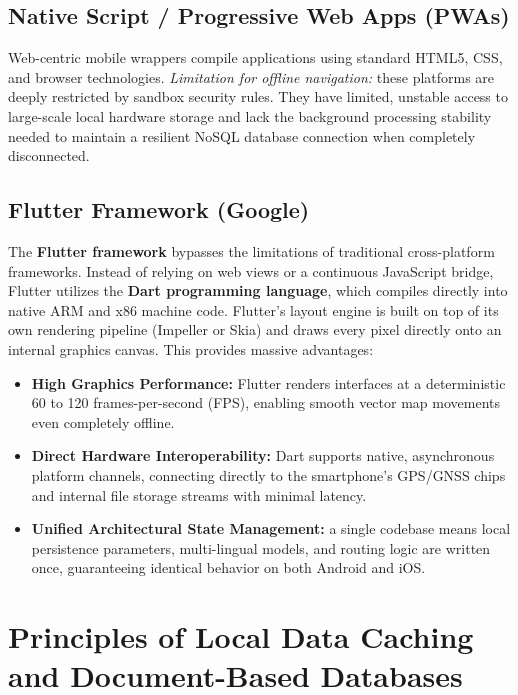 \documentclass[12pt,a4paper,oneside]{report}
\begin{document}
\subsection{Native Script / Progressive Web Apps (PWAs)}

Web-centric mobile wrappers compile applications using standard HTML5, CSS, and browser
technologies. \emph{Limitation for offline navigation:} these platforms are deeply
restricted by sandbox security rules. They have limited, unstable access to large-scale
local hardware storage and lack the background processing stability needed to maintain a
resilient NoSQL database connection when completely disconnected.

\subsection{Flutter Framework (Google)}

The \textbf{Flutter framework} bypasses the limitations of traditional cross-platform
frameworks. Instead of relying on web views or a continuous JavaScript bridge, Flutter
utilizes the \textbf{Dart programming language}, which compiles directly into native ARM
and x86 machine code. Flutter's layout engine is built on top of its own rendering
pipeline (Impeller or Skia) and draws every pixel directly onto an internal graphics
canvas. This provides massive advantages:

\begin{itemize}[leftmargin=1.4em]
  \item \textbf{High Graphics Performance:} Flutter renders interfaces at a deterministic
        60 to 120 frames-per-second (FPS), enabling smooth vector map movements even
        completely offline.
  \item \textbf{Direct Hardware Interoperability:} Dart supports native, asynchronous
        platform channels, connecting directly to the smartphone's GPS/GNSS chips and
        internal file storage streams with minimal latency.
  \item \textbf{Unified Architectural State Management:} a single codebase means local
        persistence parameters, multi-lingual models, and routing logic are written once,
        guaranteeing identical behavior on both Android and iOS.
\end{itemize}

\section{Principles of Local Data Caching and Document-Based Databases}
\end{document}
